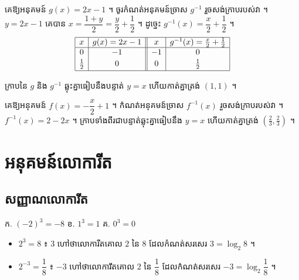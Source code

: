 \begin{example}[លំហាត់គំរូ ២]
គេឱ្យអនុគមន៍ $g(x) = 2x - 1$ ។ ចូរកំណត់អនុគមន៍ច្រាស $g^{-1}$ រួចសង់ក្រាបរបស់វា ។
\ans
$y = 2x - 1$ គេបាន $x = \dfrac{1 + y}{2} = \dfrac{y}{2} + \dfrac{1}{2}$ ។ ដូច្នេះ $g^{-1}(x) = \dfrac{x}{2} + \dfrac{1}{2}$ ។
\[
\begin{array}{|c|c||c|c|}\hline
x & g(x) = 2x - 1 & x & g^{-1}(x) = \frac{x}{2} + \frac{1}{2}\\ \hline
0 & -1 & -1 & 0\\[2pt]
\frac{1}{2} & 0 & 0 & \frac{1}{2}\\[2pt] \hline
\end{array}
\]
\begin{center}
\end{center}
ក្រាបនៃ $g$ និង $g^{-1}$ ឆ្លុះគ្នាធៀបនឹងបន្ទាត់ $y = x$ ហើយកាត់គ្នាត្រង់ $(1, 1)$ ។
\end{example}

\begin{pro}
គេឱ្យអនុគមន៍ $f(x) = -\dfrac{x}{2} + 1$ ។ កំណត់អនុគមន៍ច្រាស $f^{-1}(x)$ រួចសង់ក្រាបរបស់វា ។
\ans
$f^{-1}(x) = 2 - 2x$ ។ ក្រាបទាំងពីរជាបន្ទាត់ឆ្លុះគ្នាធៀបនឹង $y = x$ ហើយកាត់គ្នាត្រង់ $\left(\frac{2}{3}, \frac{2}{3}\right)$ ។
\end{pro}

\section{អនុគមន៍លោការីត}
\subsection{សញ្ញាណលោការីត}

\begin{example}[ឧទាហរណ៍]
ក. $(-2)^3 = -8$ \quad ខ. $1^3 = 1$ \quad គ. $0^3 = 0$
\begin{itemize}
  \item[ឃ.] $2^3 = 8$ ៖ $3$ ហៅថាលោការីតគោល $2$ នៃ $8$ ដែលកំណត់សរសេរ $3 = \log_2 8$ ។
  \item[ង.] $2^{-3} = \dfrac{1}{8}$ ៖ $-3$ ហៅថាលោការីតគោល $2$ នៃ $\dfrac{1}{8}$ ដែលកំណត់សរសេរ $-3 = \log_2\dfrac{1}{8}$ ។
\end{itemize}
\end{example}

